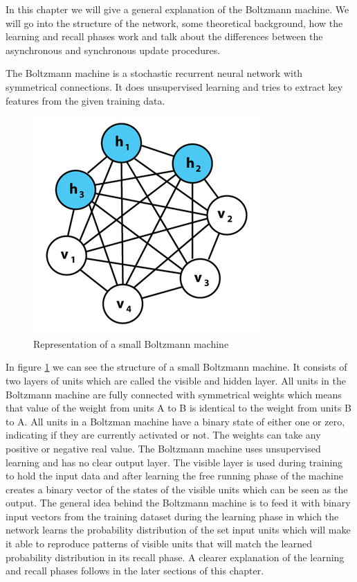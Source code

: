 \documentclass[12pt,twoside]{article}
\theoremstyle{plain}
\theoremstyle{definition}
\theoremstyle{remark}
\begin{document}
In this chapter we will give a general explanation of the Boltzmann machine. We will go into the structure of the network, some theoretical background,
how the learning and recall phases work and talk about the differences between the asynchronous and synchronous update procedures.

The Boltzmann machine is a stochastic recurrent neural network with symmetrical connections.
It does unsupervised learning and tries to extract key features from the given training data.


\begin{figure}[h]
	\centering
	\includegraphics[height=0.2\textheight]{src/boltzmann_graph}
	\caption{Representation of a small Boltzmann machine}
	\label{fig:boltzmann-graph}
\end{figure}

In figure \cref{fig:boltzmann-graph} we can see the structure of a small Boltzmann machine. It consists of two layers of units which are called the visible and hidden layer.
All units in the Boltzmann machine are fully connected with symmetrical weights which means that value of the weight from units A to B is identical to
the weight from units B to A. All units in a Boltzman machine have a binary state of either one or zero, indicating if they are currently activated or not.
The weights can take any positive or negative real value.\newline
The Boltzmann machine uses unsupervised learning and has no clear output layer. The visible layer is used during training to hold the input data and
after learning the free running phase of the machine creates a binary vector of the states of the visible units which can be seen as the output.
The general idea behind the Boltzmann machine is to feed it with binary input vectors from the training dataset during the learning phase
in which the network learns the probability distribution of the set input units which will make it able to reproduce patterns of visible units
that will match the learned probability distribution in its recall phase. A clearer explanation of the learning and recall phases follows in the 
later sections of this chapter.
\end{document}

